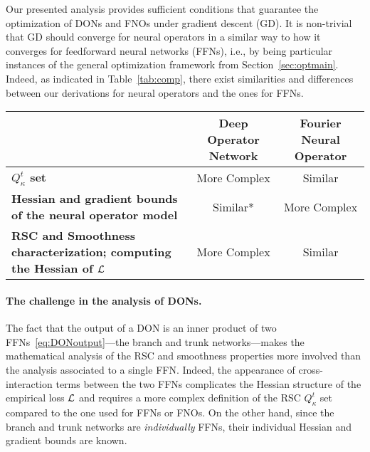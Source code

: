 %
Our presented analysis provides sufficient conditions that guarantee the optimization of DONs and FNOs under gradient descent (GD). It is non-trivial that GD should converge for neural operators in a similar way to how it converges for feedforward neural networks (FFNs), i.e., by being particular instances of the general optimization framework from Section~\ref{sec:optmain}. Indeed, as indicated in Table~\ref{tab:comp}, there exist similarities and differences between our derivations for neural operators and the ones for FFNs. 
%
\begin{table*}[t!]
    \centering
    \scriptsize %
\begin{tabular}{@{}lcc@{}}%
\toprule
    & \textbf{Deep Operator Network} & \textbf{Fourier Neural Operator} \\ 
%   
\midrule
\textbf{\centering $Q^t_{\kappa}$ set} & More Complex & Similar \\%
%
\textbf{Hessian and gradient bounds of the neural operator model} & 
Similar* & More Complex\\%
%
\textbf{RSC and Smoothness characterization; computing the Hessian of ${\mathcal{L}}$}
  & More Complex & Similar \\%
    \bottomrule
    \end{tabular}
%     
    \caption{We indicate whether a specific neural operator (DON or FNO) has a \emph{similar} or a
    \emph{more complex}
    derivation of specific mathematical objects or properties compared to a feedforward neural network (as in~\citep{banerjee2022restricted}). *The similarity is with respect to each
     of the DON.}
    \label{tab:comp}
\end{table*}
%

\paragraph{\textbf{The challenge in the analysis of DONs.}} 
The fact that the output of a DON is an inner product of two FFNs~\eqref{eq:DONoutput}---the branch and trunk networks---makes the mathematical analysis of the RSC and smoothness properties more involved than the analysis associated to a single FFN. Indeed, the appearance of cross-interaction terms between the two FFNs complicates the Hessian structure of the empirical loss ${\mathcal{L}}$ and 
requires a 
more complex definition of the RSC $Q^t_{\kappa}$ set compared to the one used for FFNs or FNOs. On the other hand, since the branch and trunk networks are \emph{individually} FFNs, their individual Hessian and gradient bounds are known. 

